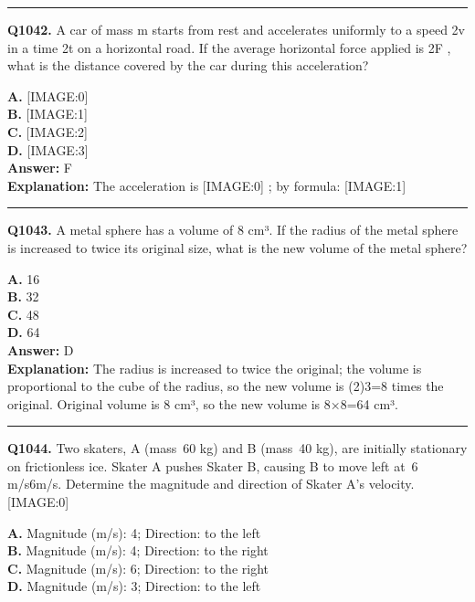 \documentclass[12pt]{article}
\begin{document}
\hrule
\vspace{1em}


\noindent
\textbf{Q1042.} A car of mass
m
starts from rest and accelerates uniformly to a speed
2v
in a time
2t
on a horizontal road. If the average horizontal force applied is
2F
, what is the distance covered by the car during this acceleration?



\textbf{A.} [IMAGE:0] \\
\textbf{B.} [IMAGE:1] \\
\textbf{C.} [IMAGE:2] \\
\textbf{D.} [IMAGE:3] \\

\textbf{Answer:} F \\
\textbf{Explanation:} The acceleration is
[IMAGE:0]
; by formula:
[IMAGE:1]

\hrule
\vspace{1em}


\noindent
\textbf{Q1043.} A metal sphere has a volume of 8 cm³. If the radius of the metal sphere is increased to twice its original size, what is the new volume of the metal sphere?



\textbf{A.} 16 \\
\textbf{B.} 32 \\
\textbf{C.} 48 \\
\textbf{D.} 64 \\

\textbf{Answer:} D \\
\textbf{Explanation:} The radius is increased to twice the original; the volume is proportional to the cube of the radius, so the new volume is (2)3=8 times the original.
Original volume is 8 cm³, so the new volume is 8×8=64 cm³.

\hrule
\vspace{1em}


\noindent
\textbf{Q1044.} Two skaters, A (mass 60
kg) and B (mass 40
kg), are initially stationary on frictionless ice. Skater A pushes Skater B, causing B to move left at 6
m/s6m/s. Determine the magnitude and direction of Skater A’s velocity.
[IMAGE:0]



\textbf{A.} Magnitude (m/s): 4; Direction: to the left \\
\textbf{B.} Magnitude (m/s): 4; Direction: to the right \\
\textbf{C.} Magnitude (m/s): 6; Direction: to the right \\
\textbf{D.} Magnitude (m/s): 3; Direction: to the left \\
\end{document}
